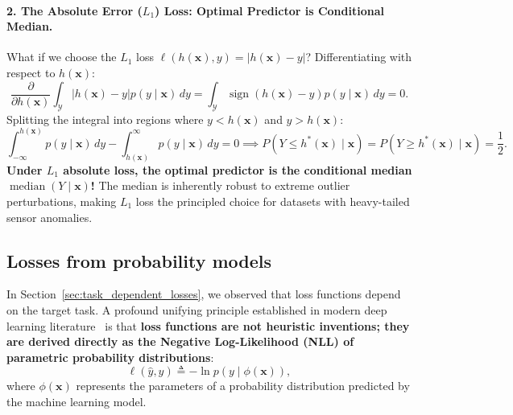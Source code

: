 \paragraph{2. The Absolute Error ($L_1$) Loss: Optimal Predictor is Conditional Median.}
What if we choose the $L_1$ loss $\ell(h(\mathbf{x}), y) = |h(\mathbf{x}) - y|$?
Differentiating with respect to $h(\mathbf{x})$:
\begin{equation}
\frac{\partial}{\partial h(\mathbf{x})} \int_{\mathcal{Y}} |h(\mathbf{x}) - y| p(y \mid \mathbf{x}) \, dy = \int_{\mathcal{Y}} \operatorname{sign}(h(\mathbf{x}) - y) p(y \mid \mathbf{x}) \, dy = 0.
\end{equation}
Splitting the integral into regions where $y < h(\mathbf{x})$ and $y > h(\mathbf{x})$:
\begin{equation}
\int_{-\infty}^{h(\mathbf{x})} p(y \mid \mathbf{x}) \, dy - \int_{h(\mathbf{x})}^\infty p(y \mid \mathbf{x}) \, dy = 0 \implies P(Y \le h^*(\mathbf{x}) \mid \mathbf{x}) = P(Y \ge h^*(\mathbf{x}) \mid \mathbf{x}) = \frac{1}{2}.
\end{equation}
\textbf{Under $L_1$ absolute loss, the optimal predictor is the conditional median $\operatorname{median}(Y \mid \mathbf{x})$!} The median is inherently robust to extreme outlier perturbations, making $L_1$ loss the principled choice for datasets with heavy-tailed sensor anomalies.

\subsection{Losses from probability models}
\label{sec:parametric_loss_construction}

In Section~\ref{sec:task_dependent_losses}, we observed that loss functions depend on the target task. A profound unifying principle established in modern deep learning literature~\cite{prince2023understanding,goodfellow2016deep} is that \textbf{loss functions are not heuristic inventions; they are derived directly as the Negative Log-Likelihood (NLL) of parametric probability distributions}:
\begin{equation}
\ell(\hat{y}, y) \triangleq -\ln p(y \mid \phi(\mathbf{x})),
\label{eq:loss_as_nll_recipe}
\end{equation}
where $\phi(\mathbf{x})$ represents the parameters of a probability distribution predicted by the machine learning model.

